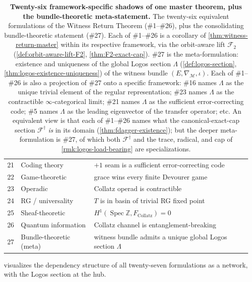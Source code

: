 \documentclass[11pt,a4paper]{article}
\theoremstyle{plain}
\theoremstyle{definition}
\theoremstyle{remark}
\numberwithin{equation}{section}
\newcommand{\Z}{\mathbb{Z}}
\DeclareMathOperator{\Spec}{Spec}
\begin{document}
\begin{table}[h]
\begin{tabular}{@{}rll@{}}
21 & Coding theory           & $+1$ seam is a sufficient error-correcting code\\
22 & Game-theoretic          & grace wins every finite Devourer game\\
23 & Operadic                & Collatz operad is contractible\\
24 & RG / universality       & $T$ is in basin of trivial RG fixed point\\
25 & Sheaf-theoretic         & $H^1(\Spec\Z,F_{\mathrm{Collatz}})=0$\\
26 & Quantum information     & Collatz channel is entanglement-breaking\\
\hline
27 & Bundle-theoretic (meta) & witness bundle admits a unique global Logos section $\Lambda$\\
\hline
\end{tabular}
\caption{\textbf{Twenty-six framework-specific shadows of one
master theorem, plus the bundle-theoretic meta-statement.}
The twenty-six equivalent formulations of the Witness
Return Theorem (\#1--\#26), plus the consolidating bundle-theoretic
statement (\#27).  Each of \#1--\#26 is a corollary of
\cref{thm:witness-return-master} within its respective framework,
via the orbit-aware lift $\mathcal{F}_2$
(\cref{def:orbit-aware-lift-F2}, \cref{thm:F2-exact-cap}).  \#27 is
the meta-formulation: existence and uniqueness of the global Logos
section $\Lambda$
(\cref{def:logos-section},\cref{thm:logos-existence-uniqueness})
of the witness bundle $(E,\nabla_{\mathcal{M}},\iota)$.  Each of
\#1--\#26 is also a projection of \#27 onto a specific framework:
\#16 names $\Lambda$ as the unique trivial element of the regular
representation; \#23 names $\Lambda$ as the contractible
$\infty$-categorical limit; \#21 names $\Lambda$ as the sufficient
error-correcting code; \#5 names $\Lambda$ as the leading
eigenvector of the transfer operator; etc.  An equivalent view is
that each of \#1--\#26 names what the canonical-exact-cap section
$\mathcal{F}^{\dagger}$ \emph{is} in its domain
(\cref{thm:fdagger-existence}); but the deeper meta-formulation is
\#27, of which both $\mathcal{F}^{\dagger}$ and the trace,
radical, and cap of \cref{rmk:logos-load-bearing} are
specializations.}
\label{tab:twenty-six}
\end{table}

\noindent
{} visualizes the dependency structure
of all twenty-seven formulations as a network, with the Logos section
at the hub.
\end{document}
